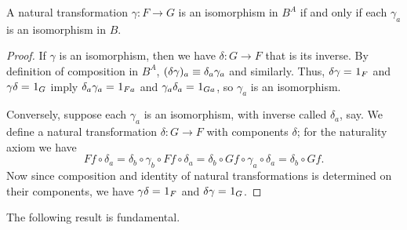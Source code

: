 \begin{lem}\label{ct:natiso}
  A natural transformation $\gamma:F\to G$ is an isomorphism in $B^A$ if and only if each $\gamma_a$ is an isomorphism in $B$.
\end{lem}
\begin{proof}
  If $\gamma$ is an isomorphism, then we have $\delta:G\to F$ that is its inverse.
  By definition of composition in $B^A$, $(\delta\gamma)_a\equiv \delta_a\gamma_a$ and similarly.
  Thus, $\delta\gamma =_{} 1_F$ and $\gamma\delta =_{} 1_G$ imply $\delta_a\gamma_a =_{} 1_{Fa}$ and $\gamma_a\delta_a =_{} 1_{Ga}$, so $\gamma_a$ is an isomorphism.

  Conversely, suppose each $\gamma_a$ is an isomorphism, with inverse called $\delta_a$, say.
We define a natural transformation $\delta:G\to F$ with components $\delta$; for the naturality axiom we have
  \[ Ff\circ \delta_a = \delta_b\circ \gamma_b\circ Ff \circ \delta_a = \delta_b\circ Gf\circ \gamma_a\circ \delta_a = \delta_b\circ Gf. \]
  Now since composition and identity of natural transformations is determined on their components, we have $\gamma\delta =_{} 1_F$ and $\delta\gamma =_{} 1_G$.
\end{proof}

The following result is fundamental.


